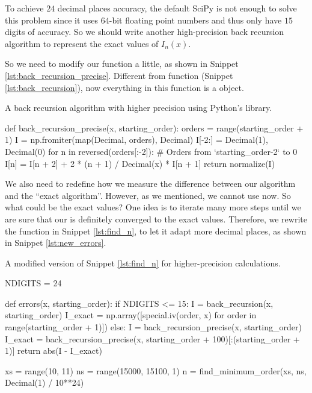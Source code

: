 \Answer To achieve $24$ decimal places accuracy, the default SciPy 
is not enough to solve this problem since it uses $64$-bit floating point numbers
and thus only have $15$ digits of accuracy.
So we should write another high-precision back recursion algorithm to represent the exact
values of $I_n(x)$.

So we need to modify our  function a little, as shown in Snippet
\ref{lst:back_recursion_precise}. Different from function 
(Snippet \ref{lst:back_recursion}), now everything in this function is a 
object.

\begin{algorithm}[H]
    \caption{A back recursion algorithm with higher precision using Python's  library.}
    \label{lst:back_recursion_precise}
    \begin{pythoncode}
        def back_recursion_precise(x, starting_order):
            orders = range(starting_order + 1)
            I = np.fromiter(map(Decimal, orders), Decimal)
            I[-2:] = Decimal(1), Decimal(0)
            for n in reversed(orders[:-2]):  # Orders from `starting_order-2` to 0
                I[n] = I[n + 2] + 2 * (n + 1) / Decimal(x) * I[n + 1]
            return normalize(I)
        \end{pythoncode}
\end{algorithm}

We also need to redefine how we measure the difference between our algorithm and the
``exact algorithm''. However, as we mentioned, we cannot use  now.
So what could be the exact values?
One idea is to iterate many more steps until we are sure that our
 is definitely converged to the exact values.
Therefore, we rewrite the function  in Snippet \ref{lst:find_n},
to let it adapt more decimal places, as shown in Snippet \ref{lst:new_errors}.

\begin{algorithm}
    \caption{A modified version of Snippet \ref{lst:find_n} for higher-precision calculations.}
    \label{lst:new_errors}
    \begin{pythoncode}
        NDIGITS = 24


        def errors(x, starting_order):
            if NDIGITS <= 15:
                I = back_recursion(x, starting_order)
                I_exact = np.array([special.iv(order, x) for order in range(starting_order + 1)])
            else:
                I = back_recursion_precise(x, starting_order)
                I_exact = back_recursion_precise(x, starting_order + 100)[:(starting_order + 1)]
            return abs(I - I_exact)


        xs = range(10, 11)
        ns = range(15000, 15100, 1)
        n = find_minimum_order(xs, ns, Decimal(1) / 10**24)
        \end{pythoncode}
\end{algorithm}

